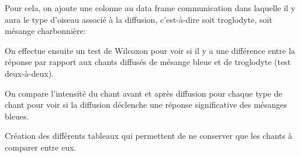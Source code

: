 \documentclass[
  french,
]{article}
\newenvironment{Shaded}{\begin{snugshade}}{\end{snugshade}}
\newcommand{\ControlFlowTok}[1]{\textcolor[rgb]{0.13,0.29,0.53}{\textbf{#1}}}
\newcommand{\DecValTok}[1]{\textcolor[rgb]{0.00,0.00,0.81}{#1}}
\newcommand{\FunctionTok}[1]{\textcolor[rgb]{0.13,0.29,0.53}{\textbf{#1}}}
\newcommand{\NormalTok}[1]{#1}
\newcommand{\OtherTok}[1]{\textcolor[rgb]{0.56,0.35,0.01}{#1}}
\newcommand{\SpecialCharTok}[1]{\textcolor[rgb]{0.81,0.36,0.00}{\textbf{#1}}}
\newcommand{\StringTok}[1]{\textcolor[rgb]{0.31,0.60,0.02}{#1}}
\begin{document}
Pour cela, on ajoute une colonne au data frame communication dans
laquelle il y aura le type d'oiseau associé à la diffusion, c'est-à-dire
soit troglodyte, soit mésange charbonnière:

\begin{Shaded}
\end{Shaded}

On effectue ensuite un test de Wilcoxon pour voir si il y a une
différence entre la réponse par rapport aux chants diffusés de mésange
bleue et de troglodyte (test deux-à-deux).

On compare l'intensité du chant avant et après diffusion pour chaque
type de chant pour voir si la diffusion déclenche une réponse
significative des mésanges bleues.

Création des différents tableaux qui permettent de ne conserver que les
chants à comparer entre eux.
\end{document}

